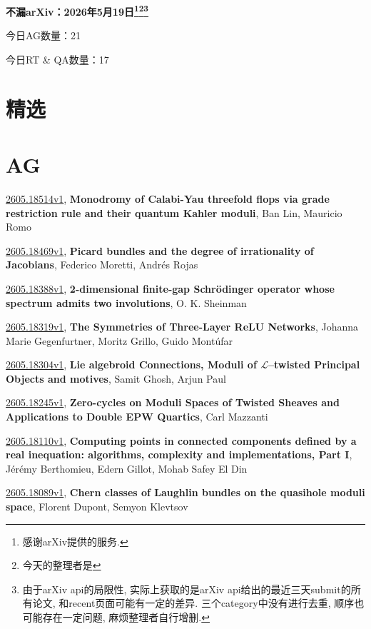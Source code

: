 \documentclass[9pt, a4paper]{article}
\theoremstyle{plain}
\theoremstyle{definition}
\theoremstyle{remark}
\newcommand{\arxiv}[3]{\href{https://arxiv.org/abs/#1}{#1}, \textbf{\textcolor{arxivblue}{#2}}, #3}
\newcommand{\AGnumber}{21}
\newcommand{\RTQAnumber}{17}
\newcommand{\NewestDate}{2026年5月19日}
\newcommand{\todayarXiver}{} %
\begin{document}
\begin{center}
    \Huge\textbf{不漏arXiv：\NewestDate\footnote{感谢arXiv提供的服务.}\footnote{今天的整理者是\todayarXiver}\footnote{由于arXiv api的局限性, 实际上获取的是arXiv api给出的最近三天submit的所有论文, 和recent页面可能有一定的差异. 三个category中没有进行去重, 顺序也可能存在一定问题, 麻烦整理者自行增删.}} \\
\end{center}

\setcounter{section}{-1}

\begin{center}
    今日AG数量：\AGnumber
    
    今日RT \& QA数量：\RTQAnumber
    
\end{center}


\section{精选}


\section{AG}
\arxiv{2605.18514v1}{Monodromy of Calabi-Yau threefold flops via grade restriction rule and their quantum Kahler moduli}{Ban Lin, Mauricio Romo}

\arxiv{2605.18469v1}{Picard bundles and the degree of irrationality of Jacobians}{Federico Moretti, Andrés Rojas}

\arxiv{2605.18388v1}{2-dimensional finite-gap Schrödinger operator whose spectrum admits two involutions}{O. K. Sheinman}

\arxiv{2605.18319v1}{The Symmetries of Three-Layer ReLU Networks}{Johanna Marie Gegenfurtner, Moritz Grillo, Guido Montúfar}

\arxiv{2605.18304v1}{Lie algebroid Connections, Moduli of $\mathcal{L}$--twisted Principal Objects and motives}{Samit Ghosh, Arjun Paul}

\arxiv{2605.18245v1}{Zero-cycles on Moduli Spaces of Twisted Sheaves and Applications to Double EPW Quartics}{Carl Mazzanti}

\arxiv{2605.18110v1}{Computing points in connected components defined by a real inequation: algorithms, complexity and implementations, Part I}{Jérémy Berthomieu, Edern Gillot, Mohab Safey El Din}

\arxiv{2605.18089v1}{Chern classes of Laughlin bundles on the quasihole moduli space}{Florent Dupont, Semyon Klevtsov}
\end{document}
